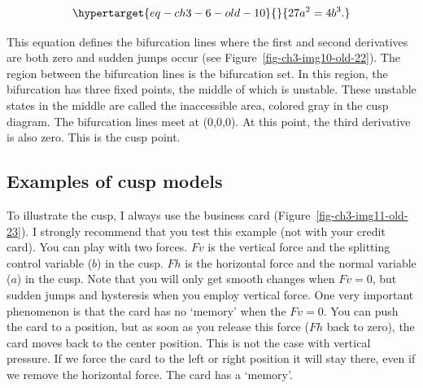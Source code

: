 \documentclass[
  a4paper,
  DIV=11,
  numbers=noendperiod,
  oneside]{scrreprt}
\begin{document}
\begin{equation}\protect\hypertarget{eq-ch3-6-old-10}{}{
27a^{2} = 4b^{3}.
}\label{eq-ch3-6-old-10}\end{equation}

This equation defines the bifurcation lines where the first and second
derivatives are both zero and sudden jumps occur (see
Figure~\ref{fig-ch3-img10-old-22}). The region between the bifurcation
lines is the bifurcation set. In this region, the bifurcation has three
fixed points, the middle of which is unstable. These unstable states in
the middle are called the inaccessible area, colored gray in the cusp
diagram. The bifurcation lines meet at (0,0,0). At this point, the third
derivative is also zero. This is the cusp point.

\hypertarget{sec-Examples-of-cusp-models}{%
\subsection{Examples of cusp models}\label{sec-Examples-of-cusp-models}}

To illustrate the cusp, I always use the business card
(Figure~\ref{fig-ch3-img11-old-23}). I strongly recommend that you test
this example (not with your credit card). You can play with two forces.
\(Fv\) is the vertical force and the splitting control variable (\(b\))
in the cusp. \(Fh\) is the horizontal force and the normal variable
(\(a\)) in the cusp. Note that you will only get smooth changes when
\(Fv = 0\), but sudden jumps and hysteresis when you employ vertical
force. One very important phenomenon is that the card has no `memory'
when the \(Fv = 0\). You can push the card to a position, but as soon as
you release this force (\(Fh\) back to zero), the card moves back to the
center position. This is not the case with vertical pressure. If we
force the card to the left or right position it will stay there, even if
we remove the horizontal force. The card has a `memory'.
\end{document}
